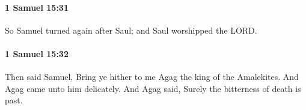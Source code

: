 		\paragraph{1 Samuel 15:31} %
			\label{1SAMUEL-15-31}

			So Samuel turned again after Saul; and Saul worshipped the LORD.


		\paragraph{1 Samuel 15:32} %
			\label{1SAMUEL-15-32}

			Then said Samuel, Bring ye hither to me Agag the king of the Amalekites. And Agag came unto him delicately. And Agag said, Surely the bitterness of death is past.


